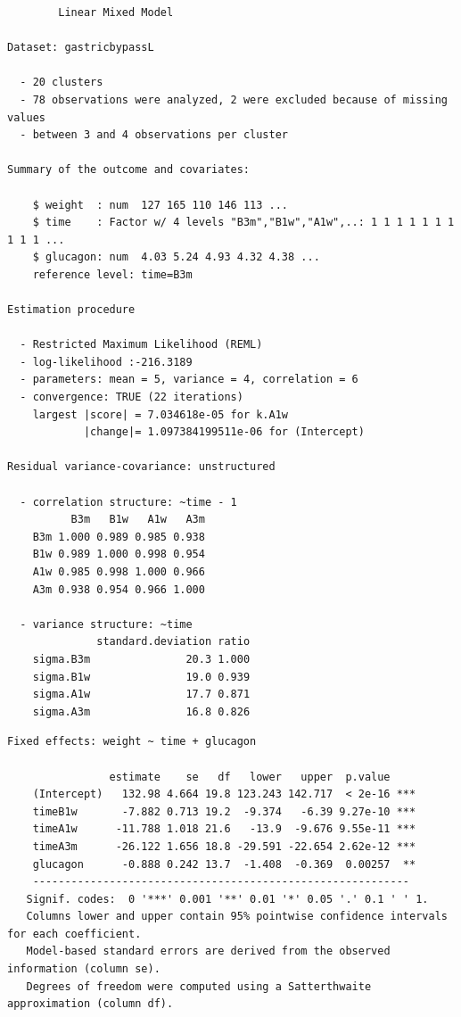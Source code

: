 \documentclass[12pt]{article}
\begin{document}
\begin{verbatim}
		Linear Mixed Model 
 
Dataset: gastricbypassL 

  - 20 clusters 
  - 78 observations were analyzed, 2 were excluded because of missing values 
  - between 3 and 4 observations per cluster 

Summary of the outcome and covariates: 

    $ weight  : num  127 165 110 146 113 ...
    $ time    : Factor w/ 4 levels "B3m","B1w","A1w",..: 1 1 1 1 1 1 1 1 1 1 ...
    $ glucagon: num  4.03 5.24 4.93 4.32 4.38 ...
    reference level: time=B3m 

Estimation procedure 

  - Restricted Maximum Likelihood (REML) 
  - log-likelihood :-216.3189
  - parameters: mean = 5, variance = 4, correlation = 6
  - convergence: TRUE (22 iterations) 
    largest |score| = 7.034618e-05 for k.A1w
            |change|= 1.097384199511e-06 for (Intercept)
 
Residual variance-covariance: unstructured 

  - correlation structure: ~time - 1 
          B3m   B1w   A1w   A3m
    B3m 1.000 0.989 0.985 0.938
    B1w 0.989 1.000 0.998 0.954
    A1w 0.985 0.998 1.000 0.966
    A3m 0.938 0.954 0.966 1.000

  - variance structure: ~time 
              standard.deviation ratio
    sigma.B3m               20.3 1.000
    sigma.B1w               19.0 0.939
    sigma.A1w               17.7 0.871
    sigma.A3m               16.8 0.826
\end{verbatim}

\clearpage

\begin{verbatim}
Fixed effects: weight ~ time + glucagon 
 
                estimate    se   df   lower   upper  p.value    
    (Intercept)   132.98 4.664 19.8 123.243 142.717  < 2e-16 ***
    timeB1w       -7.882 0.713 19.2  -9.374   -6.39 9.27e-10 ***
    timeA1w      -11.788 1.018 21.6   -13.9  -9.676 9.55e-11 ***
    timeA3m      -26.122 1.656 18.8 -29.591 -22.654 2.62e-12 ***
    glucagon      -0.888 0.242 13.7  -1.408  -0.369  0.00257  **
    ----------------------------------------------------------- 
   Signif. codes:  0 '***' 0.001 '**' 0.01 '*' 0.05 '.' 0.1 ' ' 1.
   Columns lower and upper contain 95% pointwise confidence intervals for each coefficient.
   Model-based standard errors are derived from the observed information (column se). 
   Degrees of freedom were computed using a Satterthwaite approximation (column df).
\end{verbatim}
\end{document}

